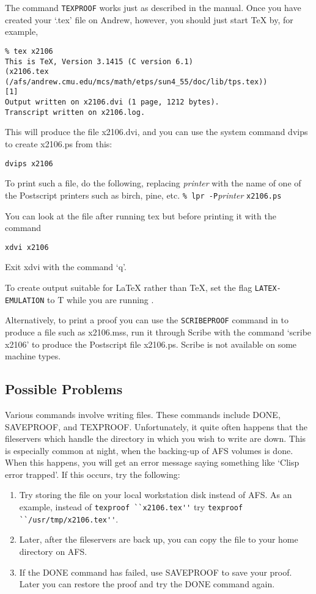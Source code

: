 \documentclass{article}
\begin{document}
The command {\tt TEXPROOF} works just as described in the {\ETPS} manual.
Once you have created your `.tex' file on Andrew, however, you should just
start TeX by, for example,
\begin{verbatim}
% tex x2106
This is TeX, Version 3.1415 (C version 6.1)
(x2106.tex (/afs/andrew.cmu.edu/mcs/math/etps/sun4_55/doc/lib/tps.tex))
[1]
Output written on x2106.dvi (1 page, 1212 bytes).
Transcript written on x2106.log.
\end{verbatim}
This will produce the file x2106.dvi, and you can use the system command
dvips to create x2106.ps from this:
\begin{verbatim}
dvips x2106
\end{verbatim}
To print such a file, do the following, replacing {\it printer} with
the name of one of the Postscript printers such as birch, pine, etc.\newline
\verb=% lpr -P={\it printer} \verb=x2106.ps=

You can look at the file after running tex but before printing it with the command
\begin{verbatim}
xdvi x2106
\end{verbatim}
Exit xdvi with the command `q'.

To create output suitable for LaTeX
rather than TeX, set the flag {\tt LATEX-EMULATION} to T while you are running {\ETPS}.

Alternatively, to print a proof
you can use the {\tt SCRIBEPROOF} command in {\ETPS} to produce a file
such as x2106.mss, run it through Scribe with the command `scribe x2106' to produce
the Postscript file x2106.ps. Scribe is not available on some machine types.

\subsection{Possible Problems}

Various {\ETPS} commands involve writing files.  These commands include
DONE, SAVEPROOF, and TEXPROOF.  Unfortunately, it quite often
happens that the fileservers which handle the directory in which you
wish to write are down.  This is especially common at night, when
the backing-up of AFS volumes is done.  When this happens, you will get
an error message saying something like `Clisp error trapped'.  If this occurs,
try the following:

\begin{enumerate}
\item Try storing the file on your local workstation disk instead of AFS.
As an example, instead of \newline
\verb=texproof ``x2106.tex''= \newline
try \newline
\verb=texproof ``/usr/tmp/x2106.tex''=.

\item Later, after the
fileservers are back up, you can copy the file to your home directory on AFS.

\item If the DONE command has failed, use SAVEPROOF to save your proof.
Later you can restore the proof and try the DONE command again.
\end{enumerate}
\end{document}

